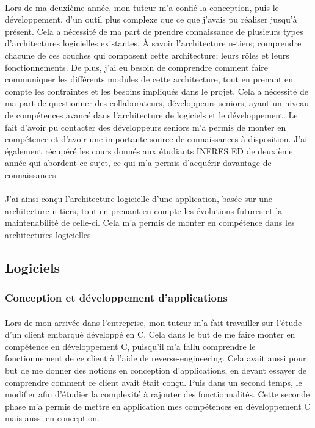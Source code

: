 \documentclass[12pt,a4paper]{report}
\begin{document}
\paragraph*{}Lors de ma deuxième année, mon tuteur m'a confié la conception, puis le développement, d'un outil plus complexe que ce que j'avais pu réaliser jusqu’à présent. Cela a nécessité de ma part de prendre connaissance de plusieurs types d'architectures logicielles existantes. À savoir l'architecture n-tiers; comprendre chacune de ces couches qui composent cette architecture; leurs rôles et leurs fonctionnements. De plus, j'ai eu besoin de comprendre comment faire communiquer les différents modules de cette architecture, tout en prenant en compte les contraintes et les besoins impliqués dans le projet. Cela a nécessité de ma part de questionner des collaborateurs, développeurs seniors, ayant un niveau de compétences avancé dans l'architecture de logiciels et le développement. Le fait d'avoir pu contacter des développeurs seniors m'a permis de monter en compétence et d'avoir une importante source de connaissances à disposition. J'ai également récupéré les cours donnés aux étudiants INFRES ED de deuxième année qui abordent ce sujet, ce qui m'a permis d'acquérir davantage de connaissances.
\paragraph*{}J'ai ainsi conçu l'architecture logicielle d'une application, basée sur une architecture n-tiers, tout en prenant en compte les évolutions futures et la maintenabilité de celle-ci. Cela m’a permis de monter en compétence dans les architectures logicielles.\\

\subsection{Logiciels}
\subsubsection{Conception et développement d'applications}
\paragraph*{}Lors de mon arrivée dans l’entreprise, mon tuteur m’a fait travailler sur l’étude d’un client embarqué développé en C. Cela dans le but de me faire monter en compétence en développement C, puisqu’il m’a fallu comprendre le fonctionnement de ce client  à l’aide de reverse-engineering. Cela avait aussi pour but de me donner des notions en conception d’applications, en devant essayer de comprendre comment ce client avait était conçu. Puis dans un second temps, le modifier afin d'étudier la complexité à rajouter des fonctionnalités. Cette seconde phase m'a permis de mettre en application mes compétences en développement C mais aussi en conception.
\end{document}
